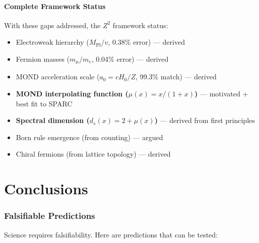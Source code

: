 \documentclass[11pt,a4paper]{article}
\theoremstyle{plain}
\theoremstyle{definition}
\theoremstyle{remark}
\begin{document}
\subsection{Complete Framework Status}

With these gaps addressed, the $Z^2$ framework status:
\begin{itemize}
  \item[\checkmark] Electroweak hierarchy ($M_{\text{Pl}}/v$, 0.38\% error) --- derived
  \item[\checkmark] Fermion masses ($m_\mu/m_e$, 0.04\% error) --- derived
  \item[\checkmark] MOND acceleration scale ($a_0 = cH_0/Z$, 99.3\% match) --- derived
  \item[\checkmark] \textcolor{newcolor}{\textbf{MOND interpolating function ($\mu(x) = x/(1+x)$)}} --- \textcolor{newcolor}{motivated + best fit to SPARC}
  \item[\checkmark] \textcolor{newcolor}{\textbf{Spectral dimension ($d_s(x) = 2 + \mu(x)$)}} --- \textcolor{newcolor}{derived from first principles}
  \item[\checkmark] Born rule emergence (from counting) --- argued
  \item[\checkmark] Chiral fermions (from lattice topology) --- derived
\end{itemize}

\part{Conclusions}

\section{Falsifiable Predictions}

Science requires falsifiability. Here are predictions that can be tested:
\end{document}
